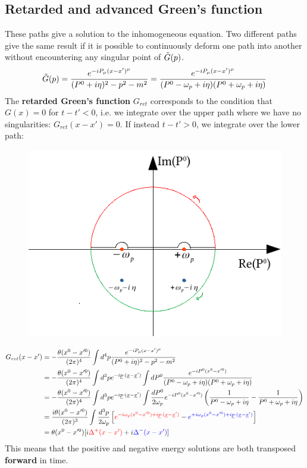 \documentclass[../main.tex]{subfiles}
\begin{document}
\subsection{Retarded and advanced Green's function}
These paths give a solution to the inhomogeneous equation. Two different paths give the same result if it is possible to continuously deform one path into another without encountering any singular point of $\Tilde{G}(p)$.
\[
\Tilde{G}(p)=\frac{e^{-iP_\mu(x-x')^\mu}}{(P^0+i\eta)^2-p^2-m^2}=\frac{e^{-iP_\mu(x-x')^\mu}}{(P^0-\omega_p+i\eta)(P^0+\omega_p+i\eta)}
\]
The \textbf{retarded Green's function} $G_{ret}$ corresponds to the condition that $G(x)=0$ for $t-t'<0$, i.e. we integrate over the upper path where we have no singularities: $G_{ret}(x-x')=0$. If instead $t-t'>0$, we integrate over the lower path:
\begin{figure}[h!]
    \includegraphics{Images/Greenfunction.pdf}
    \caption*{}
\end{figure}
\begin{align*}
G_{ret}(x-x')&=-\frac{\theta(x^0-x'^0)}{(2\pi)^4}\int d^4p\frac{e^{-iP_\mu(x-x')^\mu}}{(P^0+i\eta)^2-p^2-m^2}\\
&=-\frac{\theta(x^0-x'^0)}{(2\pi)^4}\int d^3pe^{-i\underline{p}\cdot(\underline{x}-\underline{x}')}\int dP^0\frac{e^{-iP^0(x^0-x'^0)}}{(P^0-\omega_p+i\eta)(P^0+\omega_p+i\eta)}\\
&=-\frac{\theta(x^0-x'^0)}{(2\pi)^4}\int d^3pe^{-i\underline{p}\cdot(\underline{x}-\underline{x}')}\int \frac{dP^0}{2\omega_p}e^{-iP^0(x^0-x'^0)}\left(\frac{1}{P^0-\omega_p+i\eta}-\frac{1}{P^0+\omega_p+i\eta}\right)\\
&=\frac{i\theta(x^0-x'^0)}{(2\pi)^3}\int\frac{d^3p}{2\omega_p}\left[{\color{red}e^{-i\omega_p(x^0-x'^0)+i\underline{p}\cdot(\underline{x}-\underline{x}')}}-{\color{blue}e^{+i\omega_p(x^0-x'^0)+i\underline{p}\cdot(\underline{x}-\underline{x}')}}\right]\\
&=\theta(x^0-x'^0)[i{\color{red}\Delta^+(x-x')}+i{\color{blue}\Delta^-(x-x')}]
\end{align*}
This means that the positive and negative energy solutions are both transposed \textbf{forward} in time.
\end{document}
